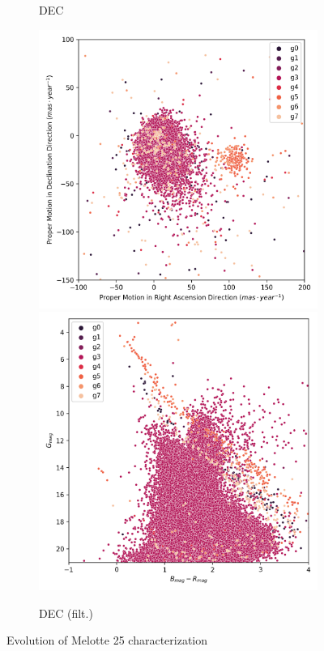 \documentclass[11pt,a4paper,english,twocolumn]{article}
\begin{document}
\begin{figure}[!htbp]
\begin{subfigure}[b]{0.3\textwidth}
      \caption{DEC}
  \end{subfigure}
  \medskip
  \begin{subfigure}[b]{0.3\textwidth}
    \centering
      \includegraphics[width=\textwidth]{../figures/melotte_25/dec_pm_filtered_melotte_25.png}
      \includegraphics[width=\textwidth]{../figures/melotte_25/dec_hr_diagram_filtered_melotte_25.png}
      \caption{DEC (filt.)}
  \end{subfigure}
  \caption{Evolution of Melotte 25 characterization}
  \label{fig:melotte_25_characterization_evolution}
\end{figure}
\end{document}
